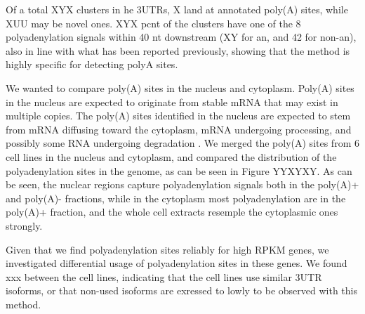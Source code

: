 \documentclass[a4paper]{article}
\begin{document}
Of a total XYX clusters in he 3UTRs, X land at annotated
poly(A) sites, while XUU may be novel ones. XYX pcnt of the clusters have one of the
8 polyadenylation signals within 40 nt downstream (XY for an, and 42 for
non-an), also in line with what has been reported previously, showing that the method is highly specific for detecting polyA sites.

We wanted to compare poly(A) sites in the nucleus and cytoplasm. Poly(A) sites
in the nucleus are expected to originate from stable mRNA that may exist in
multiple copies. The poly(A) sites identified in the nucleus are expected to
stem from mRNA diffusing toward the cytoplasm, mRNA undergoing
processing, and possibly some RNA undergoing degradation
\cite{shcherbik_polyadenylation_2010,slomovic_addition_2010}. We merged the
poly(A) sites from 6 cell lines in the nucleus and cytoplasm, and compared the
distribution of the polyadenylation sites in the genome, as can be seen in
Figure YYXYXY. As can be seen, the nuclear regions capture polyadenylation
signals both in the poly(A)+ and poly(A)- fractions, while in the cytoplasm
most polyadenylation are in the poly(A)+ fraction, and the whole cell extracts
resemple the cytoplasmic ones strongly.

Given that we find polyadenylation sites reliably for high RPKM genes, we
investigated differential usage of polyadenylation sites in these genes. We
found xxx between the cell lines, indicating that the cell lines use similar
3UTR isoforms, or that non-used isoforms are exressed to lowly to be observed
with this method.



\end{document}
